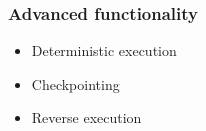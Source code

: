 \begin{frame}
\frametitle{Advanced functionality}

\begin{itemize}
	\item Deterministic execution
	\item Checkpointing
	\item Reverse execution
\end{itemize}

\end{frame}
